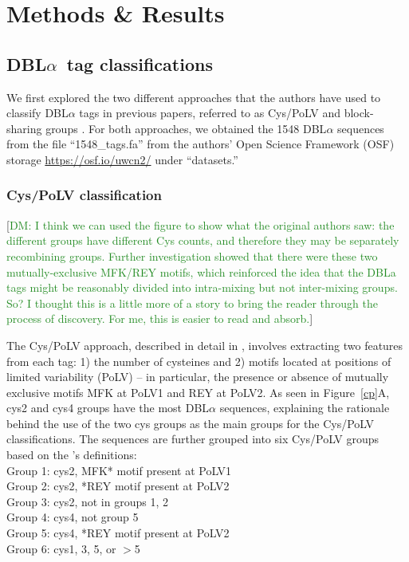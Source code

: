 \documentclass[10pt,twocolumn,superscriptaddress]{revtex4-1}
\newcommand{\dieumycom}[1]{[\textcolor{ForestGreen}{DM: #1}]}
\newcommand{\dbla}{{DBL$\alpha$}\xspace}
\newcommand{\cp}{{Cys/PoLV}\xspace}
\begin{document}
\section{Methods \& Results}

\subsection{\dbla\ tag classifications}
We first explored the two different approaches that the authors have used to classify \dbla tags in previous papers, referred to as \cp \cite{bull2007} and block-sharing groups \cite{bull2008}. For both approaches, we obtained the 1548 \dbla sequences from the file ``1548\_tags.fa'' from the authors' Open Science Framework (OSF) storage \url{https://osf.io/uwcn2/} under ``datasets.''  



\subsubsection{\cp classification}
\dieumycom{I think we can used the figure to show what the original authors saw: the different groups have different Cys counts, and therefore they may be separately recombining groups.
Further investigation showed that there were these two mutually-exclusive MFK/REY motifs, which reinforced the idea that the DBLa tags might be reasonably divided into intra-mixing but not inter-mixing groups.
So? I thought this is a little more of a story to bring the reader through the process of discovery. For me, this is easier to read and absorb.}



The \cp approach, described in detail in \cite{bull2007}, involves extracting two features from each tag: 1) the number of cysteines and 2) motifs located at positions of limited variability (PoLV) -- in particular, the presence or absence of mutually exclusive motifs MFK at PoLV1 and REY at PoLV2. As seen in Figure~\ref{cp}A, cys2 and cys4 groups have the most \dbla sequences, explaining the rationale behind the use of the two cys groups as the main groups for the \cp classifications. The sequences are further grouped into six \cp groups based on the \cite{bull2007}'s definitions:  \\

\noindent Group 1: cys2, MFK* motif present at PoLV1  \\
Group 2: cys2, *REY motif present at PoLV2   \\
Group 3: cys2, not in groups 1, 2   \\
Group 4: cys4, not group 5   \\
Group 5: cys4, *REY motif present at PoLV2  \\
Group 6: cys1, 3, 5, or $>$5  \\
\end{document}
